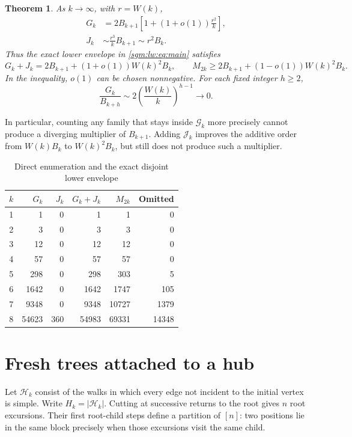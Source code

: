 \documentclass[11pt,letterpaper]{article}
\newtheorem{theorem}{Theorem}[section]
\theoremstyle{remark}\newtheorem{remark}[theorem]{Remark}
\newcommand{\Gc}{\mathcal G}\newcommand{\Hc}{\mathcal H}\newcommand{\Jc}{\mathcal J}
\theoremstyle{definition}\newtheorem{definition}[theorem]{Definition}
\begin{document}
\begin{theorem}\label{sgm:lw:thm:asympt}
As $k\to\infty$, with $r=W(k)$,
\begin{align}
 G_k&=2B_{k+1}\left[1+(1+o(1))\frac{r^2}{k}\right],\label{sgm:lw:eq:Gasym}\\
 J_k&\sim\frac{r^3}{k}B_{k+1}\sim r^2B_k.\label{sgm:lw:eq:Jasym}
\end{align}
Thus the exact lower envelope in \eqref{sgm:lw:eq:main} satisfies
\begin{equation}\label{sgm:lw:eq:lowerasym}
 G_k+J_k=2B_{k+1}+(1+o(1))W(k)^2B_k,
 \qquad
 M_{2k}\ge2B_{k+1}+(1-o(1))W(k)^2B_k.
\end{equation}
In the inequality, $o(1)$ can be chosen nonnegative. For each fixed integer $h\ge2$,
\begin{equation}\label{sgm:lw:eq:limitation}
 \frac{G_k}{B_{k+h}}\sim2\left(\frac{W(k)}{k}\right)^{h-1}\longrightarrow0.
\end{equation}
\end{theorem}
In particular, counting any family that stays inside $\Gc_k$ more precisely cannot produce a diverging multiplier of $B_{k+1}$. Adding $\Jc_k$ improves the additive order from $W(k)B_k$ to $W(k)^2B_k$, but still does not produce such a multiplier.

\begin{table}[htbp]\centering\small
\caption{Direct enumeration and the exact disjoint lower envelope}\label{sgm:lw:tab:exact}
\begin{tabular}{r r r r r r}\toprule
$k$ & $G_k$ & $J_k$ & $G_k+J_k$ & $M_{2k}$ & Omitted \\ \midrule
1 & 1 & 0 & 1 & 1 & 0 \\
2 & 3 & 0 & 3 & 3 & 0 \\
3 & 12 & 0 & 12 & 12 & 0 \\
4 & 57 & 0 & 57 & 57 & 0 \\
5 & 298 & 0 & 298 & 303 & 5 \\
6 & 1642 & 0 & 1642 & 1747 & 105 \\
7 & 9348 & 0 & 9348 & 10727 & 1379 \\
8 & 54623 & 360 & 54983 & 69331 & 14348 \\
\bottomrule\end{tabular}
\end{table}

\section{Fresh trees attached to a hub}
Let $\Hc_k$ consist of the walks in which every edge not incident to the initial vertex is simple. Write $H_k=|\Hc_k|$. Cutting at successive returns to the root gives $n$ root excursions. Their first root-child steps define a partition of $[n]$: two positions lie in the same block precisely when those excursions visit the same child.
\end{document}
